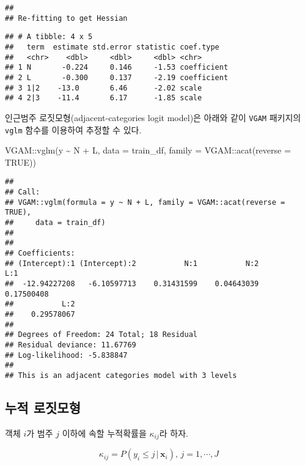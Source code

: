 \documentclass[
]{book}
\newenvironment{Shaded}{\begin{snugshade}}{\end{snugshade}}
\newcommand{\AttributeTok}[1]{\textcolor[rgb]{0.77,0.63,0.00}{#1}}
\newcommand{\ConstantTok}[1]{\textcolor[rgb]{0.00,0.00,0.00}{#1}}
\newcommand{\FunctionTok}[1]{\textcolor[rgb]{0.00,0.00,0.00}{#1}}
\newcommand{\NormalTok}[1]{#1}
\newcommand{\SpecialCharTok}[1]{\textcolor[rgb]{0.00,0.00,0.00}{#1}}
\begin{document}
\begin{verbatim}
## 
## Re-fitting to get Hessian
\end{verbatim}

\begin{verbatim}
## # A tibble: 4 x 5
##   term  estimate std.error statistic coef.type  
##   <chr>    <dbl>     <dbl>     <dbl> <chr>      
## 1 N       -0.224     0.146     -1.53 coefficient
## 2 L       -0.300     0.137     -2.19 coefficient
## 3 1|2    -13.0       6.46      -2.02 scale      
## 4 2|3    -11.4       6.17      -1.85 scale
\end{verbatim}

인근범주 로짓모형(adjacent-categories logit model)은 아래와 같이 \texttt{VGAM} 패키지의 \texttt{vglm} 함수를 이용하여 추정할 수 있다.

\begin{Shaded}
\begin{Highlighting}[]
\NormalTok{VGAM}\SpecialCharTok{::}\FunctionTok{vglm}\NormalTok{(y }\SpecialCharTok{\textasciitilde{}}\NormalTok{ N }\SpecialCharTok{+}\NormalTok{ L,}
           \AttributeTok{data =}\NormalTok{ train\_df,}
           \AttributeTok{family =}\NormalTok{ VGAM}\SpecialCharTok{::}\FunctionTok{acat}\NormalTok{(}\AttributeTok{reverse =} \ConstantTok{TRUE}\NormalTok{))}
\end{Highlighting}
\end{Shaded}

\begin{verbatim}
## 
## Call:
## VGAM::vglm(formula = y ~ N + L, family = VGAM::acat(reverse = TRUE), 
##     data = train_df)
## 
## 
## Coefficients:
## (Intercept):1 (Intercept):2           N:1           N:2           L:1 
##  -12.94227208   -6.10597713    0.31431599    0.04643039    0.17500408 
##           L:2 
##    0.29578067 
## 
## Degrees of Freedom: 24 Total; 18 Residual
## Residual deviance: 11.67769 
## Log-likelihood: -5.838847 
## 
## This is an adjacent categories model with 3 levels
\end{verbatim}

\hypertarget{cumulative-logit-model}{%
\subsection{누적 로짓모형}\label{cumulative-logit-model}}

객체 \(i\)가 범주 \(j\) 이하에 속할 누적확률을 \(\kappa_{ij}\)라 하자.

\begin{equation*}
\kappa_{ij} = P(y_i \leq j \, | \, \mathbf{x}_i), \, j = 1, \cdots, J
\end{equation*}
\end{document}
